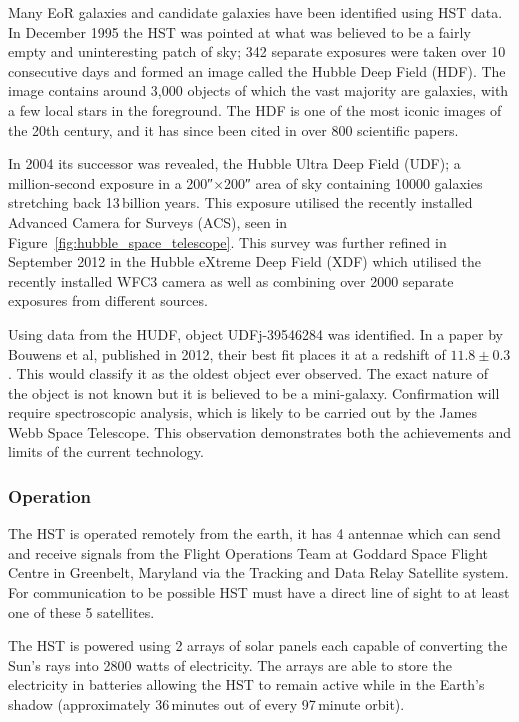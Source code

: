 		Many EoR galaxies and candidate galaxies have been identified using HST data. In December 1995 the HST was pointed at what was believed to be a fairly empty and uninteresting patch of sky; 342 separate exposures were taken over 10 consecutive days and formed an image called the Hubble Deep Field (HDF)\cite{ESA_2}. The image contains around 3,000 objects of which the vast majority are galaxies, with a few local stars in the foreground. The HDF is one of the most iconic images of the 20th century, and it has since been cited in over 800 scientific papers.

		In 2004 its successor was revealed, the Hubble Ultra Deep Field (UDF); a million-second exposure in a 200\si{\arcsecond}$\times$200\si{\arcsecond} area of sky containing \num{10000} galaxies stretching back 13\,billion years\cite{Hubsite_2}. This exposure utilised the recently installed Advanced Camera for Surveys (ACS), seen in Figure~\ref{fig:hubble_space_telescope}. This survey was further refined in September 2012 in the Hubble eXtreme Deep Field (XDF) which utilised the recently installed WFC3 camera as well as combining over \num{2000} separate exposures from different sources\cite{ESA_2}.

		Using data from the HUDF, object UDFj-39546284 was identified. In a paper by Bouwens et al, published in 2012, their best fit places it at a redshift of $11.8\pm0.3$\cite{Bouwens2012}. This would classify it as the oldest object ever observed. The exact nature of the object is not known but it is believed to be a mini-galaxy. Confirmation will require spectroscopic analysis, which is likely to be carried out by the James Webb Space Telescope. This observation demonstrates both the achievements and limits of the current technology.

	\subsubsection{Operation} %
	\label{ssub:operation}
		The HST is operated remotely from the earth, it has 4 antennae which can send and receive signals from the Flight Operations Team at Goddard Space Flight Centre in Greenbelt, Maryland via the Tracking and Data Relay Satellite system. For communication to be possible HST must have a direct line of sight to at least one of these 5 satellites.

		The HST is powered using 2 arrays of solar panels each capable of converting the Sun's rays into \num{2800} watts of electricity. The arrays are able to store the electricity in batteries allowing the HST to remain active while in the Earth's shadow (approximately 36\,minutes out of every 97\,minute orbit).

